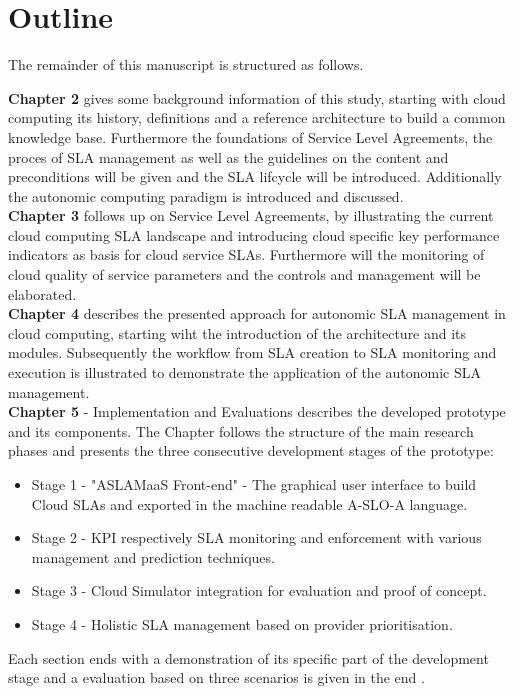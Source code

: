 \section{Outline}
The remainder of this manuscript is structured as follows. 

\textbf{Chapter 2} gives some background information of this study, starting with cloud computing its history,  definitions and a reference architecture to build a common knowledge base. Furthermore the foundations of Service Level Agreements, the proces of SLA management as well as the guidelines on the content and preconditions will be given and the SLA lifcycle will be introduced. Additionally the autonomic computing paradigm is introduced and discussed.\\

\textbf{Chapter 3} follows up on Service Level Agreements, by illustrating the current cloud computing SLA landscape and introducing cloud specific key performance indicators as basis for cloud service SLAs. Furthermore will the monitoring of cloud quality of service parameters and the controls and management will be elaborated.\\

\textbf{Chapter 4}  describes the presented approach for autonomic SLA management in cloud computing, starting wiht the introduction of the architecture and its modules. Subsequently the workflow from SLA creation to SLA monitoring and execution is illustrated to demonstrate the application of the autonomic SLA management.\\


\textbf{Chapter 5 }- Implementation and Evaluations describes the developed prototype and its components. The Chapter follows the structure of the main research phases and presents the three consecutive development stages of the prototype:
\begin{itemize}
\item  Stage 1 - "ASLAMaaS Front-end" - The graphical user interface to build Cloud SLAs and exported in the machine readable A-SLO-A language.
 \item Stage 2 - KPI respectively SLA monitoring and enforcement with various management and prediction techniques.
 \item Stage 3 - Cloud Simulator integration for evaluation and proof of concept. 
 \item Stage 4 - Holistic SLA management based on provider prioritisation.
\end{itemize}
 Each section ends with a demonstration of its specific part of the development stage and a evaluation based on three scenarios is given in the end .\\

